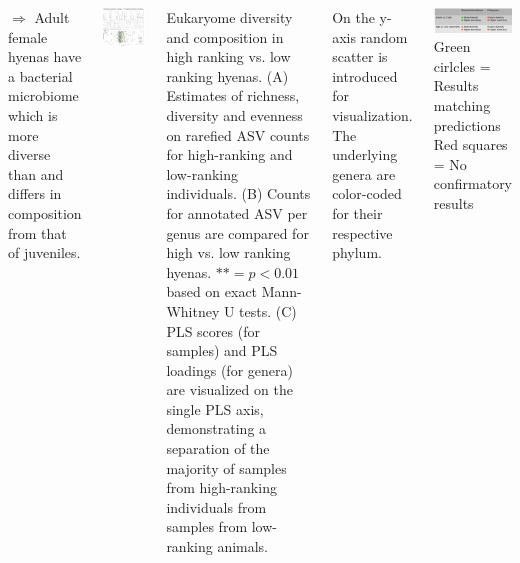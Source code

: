 \documentclass[30pt, a0paper, portrait, margin=0mm, innermargin=15mm,
               blockverticalspace=15mm, colspace=15mm, subcolspace=8mm]{tikzposter}
\begin{document}
\begin{columns}
{  $\Rightarrow$ Adult female hyenas have a bacterial microbiome which is more
  diverse than and differs in composition from that of juveniles.
}

 {
  \begin{minipage}{0.5\linewidth}                  
    \includegraphics[scale=0.45]{Figure4_man.png}
  \end{minipage}
  \hfill
  \begin{minipage}{0.5\linewidth}
     Eukaryome diversity and composition in high ranking
    vs. low ranking hyenas. (A) Estimates of richness, diversity and
    evenness on rarefied ASV counts for high-ranking and low-ranking
    individuals. (B) Counts for annotated ASV per genus are compared
    for high vs. low ranking hyenas. $** = p < 0.01$ based on exact
    Mann-Whitney U tests. (C) PLS scores (for samples) and PLS
    loadings (for genera) are visualized on the single PLS axis,
    demonstrating a separation of the majority of samples from
    high-ranking individuals from samples from low-ranking animals.
  \end{minipage}
  On the y-axis random scatter is introduced for visualization. The
  underlying genera are color-coded for their respective phylum.
}


{
    \includegraphics[scale=0.85]{summary.png}\\
    Green cirlcles = Results matching predictions \hspace{1cm}
    Red squares = No confirmatory results
}


\end{columns}
\end{document}
